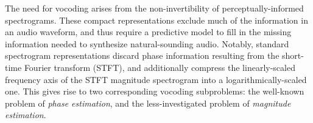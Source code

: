\documentclass[a4paper]{article}
\begin{document}
The need for vocoding arises from the non-invertibility of perceptually-informed spectrograms. 
These compact representations
exclude much of the information in an audio waveform, 
and thus require a predictive model to fill in the missing information needed to synthesize natural-sounding audio. 
Notably, standard spectrogram representations discard phase information resulting from the short-time Fourier transform (STFT), 
and additionally compress the linearly-scaled frequency axis of the STFT magnitude spectrogram into a logarithmically-scaled one. 
This gives rise to two corresponding vocoding subproblems: 
the well-known problem of \emph{phase estimation}, 
and the less-investigated problem of \emph{magnitude estimation}.


\end{document}
